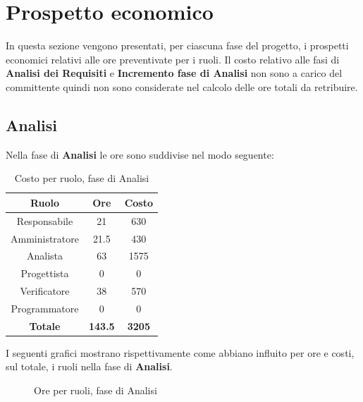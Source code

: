 \section{Prospetto economico}
In questa sezione vengono presentati, per ciascuna fase del progetto, i prospetti economici relativi alle ore preventivate per i ruoli. Il costo relativo alle fasi di \textbf{Analisi dei Requisiti} e \textbf{Incremento fase di Analisi} non sono a carico del committente quindi non sono considerate nel calcolo delle ore totali da retribuire.

\subsection{Analisi}
Nella fase di \textbf{Analisi} le ore sono suddivise nel modo seguente:
\begin{table}[H]
  \centering
  \begin{tabular}{|c|c|c|}
  \hline
  \textbf{Ruolo} &
  \textbf{Ore} &
  \textbf{Costo} \\
  \hline
  Responsabile & 21 & 630\\
  \hline
  Amministratore & 21.5 & 430\\
  \hline
  Analista & 63 & 1575\\
  \hline
  Progettista & 0 & 0 \\
  \hline
  Verificatore & 38 & 570\\
  \hline
  Programmatore & 0 & 0 \\
  \hline
   \textbf{Totale} & \textbf{143.5} & \textbf{3205} \\
    \hline
  \end{tabular}
  \caption{Costo per ruolo, fase di Analisi}
\end{table}

I seguenti grafici mostrano rispettivamente come abbiano influito per ore e costi, sul totale, i ruoli nella fase di \textbf{Analisi}.
\begin{figure}[H]
\centering
{}
\caption{Ore per ruoli, fase di Analisi}
\end{figure}

